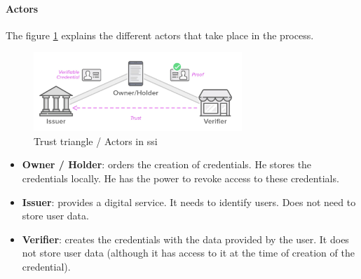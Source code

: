 \paragraph{Actors}
The figure \ref{fig:trust-triangle} explains the different actors\cite{ssi-guide} that take place in the process.
\begin{figure}[h]
    \centering
    \includegraphics[width=0.7\textwidth]{images/State of the Art/ssi/trust-triangle.png}
    \caption{Trust triangle / Actors in \acrshort{ssi}}
    \label{fig:trust-triangle}
\end{figure}
\begin{itemize}
    \item \textbf{Owner / Holder}: orders the creation of credentials. He stores the credentials locally. He has the power to revoke access to these credentials.
    \item \textbf{Issuer}: provides a digital service. It needs to identify users. Does not need to store user data.
    \item \textbf{Verifier}: creates the credentials with the data provided by the user. It does not store user data (although it has access to it at the time of creation of the credential).
\end{itemize}

